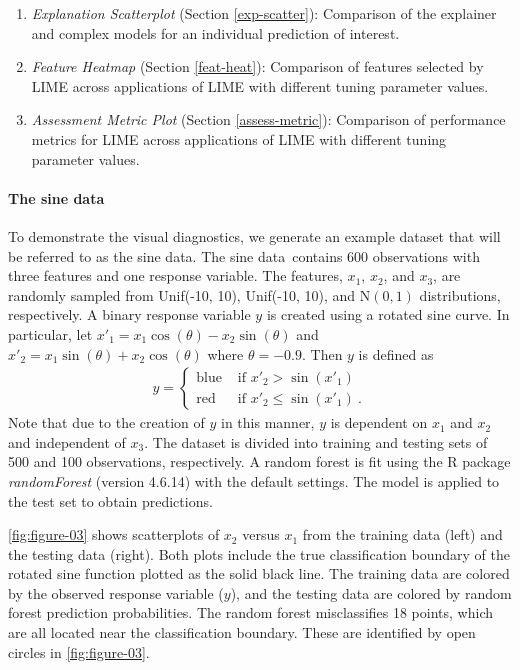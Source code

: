 \documentclass[AMS,STIX2COL]{WileyNJD-v2}\usepackage[]{graphicx}\usepackage[]{color}
\newcommand{\data}{sine data}
\begin{document}
\begin{enumerate}
\item \emph{Explanation Scatterplot} (Section \ref{exp-scatter}): Comparison of the explainer and complex models for an individual prediction of interest.
\item \emph{Feature Heatmap} (Section \ref{feat-heat}): Comparison of features selected by LIME across applications of LIME with different tuning parameter values.
\item \emph{Assessment Metric Plot} (Section \ref{assess-metric}): Comparison of performance metrics for LIME across applications of LIME with different tuning parameter values. 
\end{enumerate}

\paragraph{The \data}

To demonstrate the visual diagnostics, we generate an example dataset that will be referred to as the \data. The \data \ contains 600 observations with three features and one response variable. The features, $x_1$, $x_2$, and $x_3$, are randomly sampled from Unif(-10, 10), Unif(-10, 10), and $\mbox{N}(0,1)$ distributions, respectively. A binary response variable $y$ is  created using a rotated sine curve. In particular, let $x'_1=x_1\cos(\theta)-x_2\sin(\theta)$ and $x'_2=x_1\sin(\theta)+x_2\cos(\theta)$ where $\theta=-0.9$. Then $y$ is defined as
\begin{eqnarray}\label{eq:data}
  y=\begin{cases}
  \mbox{blue} & \mbox{ if } x'_2 > \sin\left(x'_1\right) \\
  \mbox{red} & \mbox{ if } x'_2 \le \sin\left(x'_1\right) \ . %
  \end{cases}
\end{eqnarray}
Note that due to the creation of $y$ in this manner, $y$ is dependent on $x_1$ and $x_2$ and independent of $x_3$. The dataset is divided into training and testing sets of 500 and 100 observations, respectively.  A random forest  is fit using the R package \emph{randomForest} (version 4.6.14) \citep{liaw:2002} with the default settings. The model is applied to the test set to obtain predictions. 

\autoref{fig:figure-03} shows scatterplots of $x_2$ versus $x_1$ from the training data (left) and the testing data (right). Both plots include the true classification boundary of the rotated sine function plotted as the solid black line. The training data are colored by the observed response variable ($y$), and the testing data are colored by random forest  prediction probabilities. The random forest  misclassifies 18 points, which are all located near  the classification boundary. These are identified by open circles in \autoref{fig:figure-03}. 
\end{document}
